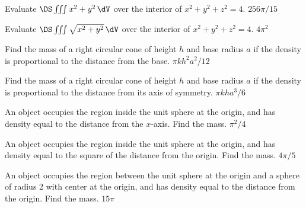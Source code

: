 \begin{multicols}{2}
\problem Evaluate $\DS\iiint x^2+y^2\,\dV $ 
over the interior of $x^2+y^2+z^2=4$.
\answer
$256\pi/15$
\endanswer

\problem Evaluate $\DS\iiint \sqrt{x^2+y^2}\,\dV $ 
over the interior of $x^2+y^2+z^2=4$.
\answer
$4\pi^2$
\endanswer

\problem Find the mass of a right circular cone of height $h$ and 
base radius $a$ if the density is proportional to the distance from
the base.
\answer
$\pi kh^2a^2/12$
\endanswer

\problem Find the mass of a right circular cone of height $h$ and 
base radius $a$ if the density is proportional to the distance from
its axis of symmetry.
\answer
$\pi kha^3/6$
\endanswer

\problem An object occupies the region inside the unit sphere at the 
origin, and has density equal to the distance from the $x$-axis. Find
the mass.
\answer
$\pi^2/4$
\endanswer

\problem An object occupies the region inside the unit sphere at the 
origin, and has density equal to the square of the distance from the
origin. Find the mass.
\answer
$4\pi/5$
\endanswer

\problem An object occupies the region between the unit sphere at the 
origin and a sphere of radius 2 with center at the origin, and has
density equal to the distance from the origin. Find the mass.
\answer
$15\pi$
\endanswer





\end{multicols}
\noproblemfont




